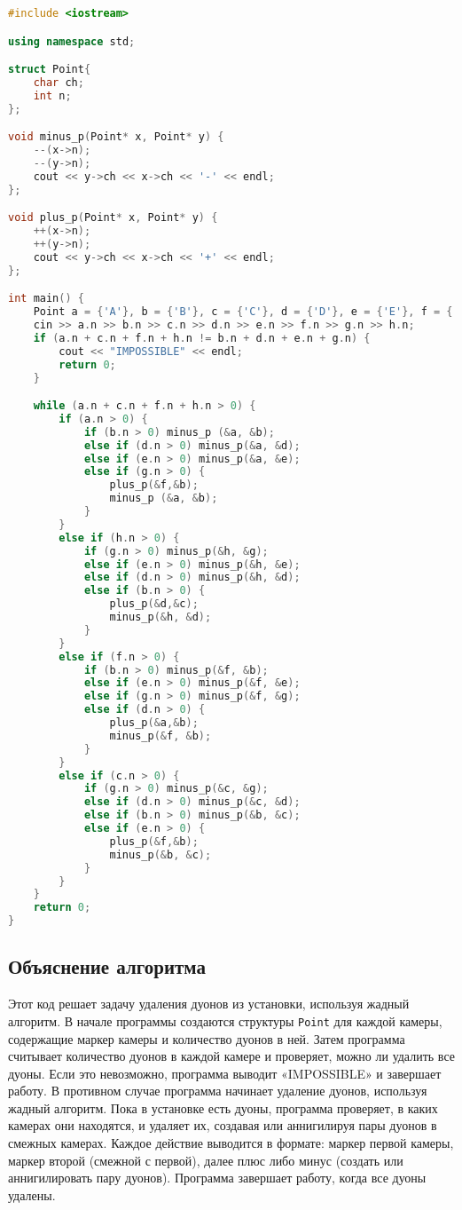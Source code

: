 \documentclass[a4paper]{article}
\newcommand{\addsubsection}[1]{
    \phantomsection
    \addcontentsline{toc}{subsection}{#1}
    \subsection*{\centering #1}
}
\begin{document}
\begin{lstlisting}[language=c++]
#include <iostream>

using namespace std;

struct Point{
    char ch;
    int n;
};

void minus_p(Point* x, Point* y) {
    --(x->n);
    --(y->n);
    cout << y->ch << x->ch << '-' << endl;
};

void plus_p(Point* x, Point* y) {
    ++(x->n);
    ++(y->n);
    cout << y->ch << x->ch << '+' << endl;
};

int main() {
    Point a = {'A'}, b = {'B'}, c = {'C'}, d = {'D'}, e = {'E'}, f = {'F'}, g = {'G'}, h = {'H'};
    cin >> a.n >> b.n >> c.n >> d.n >> e.n >> f.n >> g.n >> h.n;
    if (a.n + c.n + f.n + h.n != b.n + d.n + e.n + g.n) {
        cout << "IMPOSSIBLE" << endl;
        return 0;
    }

    while (a.n + c.n + f.n + h.n > 0) {
        if (a.n > 0) {
            if (b.n > 0) minus_p (&a, &b);
            else if (d.n > 0) minus_p(&a, &d);
            else if (e.n > 0) minus_p(&a, &e);
            else if (g.n > 0) {
                plus_p(&f,&b);
                minus_p (&a, &b);
            }
        }
        else if (h.n > 0) {
            if (g.n > 0) minus_p(&h, &g);
            else if (e.n > 0) minus_p(&h, &e);
            else if (d.n > 0) minus_p(&h, &d);
            else if (b.n > 0) {
                plus_p(&d,&c);
                minus_p(&h, &d);
            }
        }
        else if (f.n > 0) {
            if (b.n > 0) minus_p(&f, &b);
            else if (e.n > 0) minus_p(&f, &e);
            else if (g.n > 0) minus_p(&f, &g);
            else if (d.n > 0) {
                plus_p(&a,&b);
                minus_p(&f, &b);
            }
        }
        else if (c.n > 0) {
            if (g.n > 0) minus_p(&c, &g);
            else if (d.n > 0) minus_p(&c, &d);
            else if (b.n > 0) minus_p(&b, &c);
            else if (e.n > 0) {
                plus_p(&f,&b);
                minus_p(&b, &c);
            }
        }
    }
    return 0;
}
\end{lstlisting}
\addsubsection{Объяснение алгоритма}
Этот код решает задачу удаления дуонов из установки, используя жадный алгоритм. В начале программы создаются структуры \verb|Point| для каждой камеры, содержащие маркер камеры и количество дуонов в ней. Затем программа считывает количество дуонов в каждой камере и проверяет, можно ли удалить все дуоны. Если это невозможно, программа выводит «IMPOSSIBLE» и завершает работу. В противном случае программа начинает удаление дуонов, используя жадный алгоритм. Пока в установке есть дуоны, программа проверяет, в каких камерах они находятся, и удаляет их, создавая или аннигилируя пары дуонов в смежных камерах. Каждое действие выводится в формате: маркер первой камеры, маркер второй (смежной с первой), далее плюс либо минус (создать или аннигилировать пару дуонов). Программа завершает работу, когда все дуоны удалены.
\end{document}
